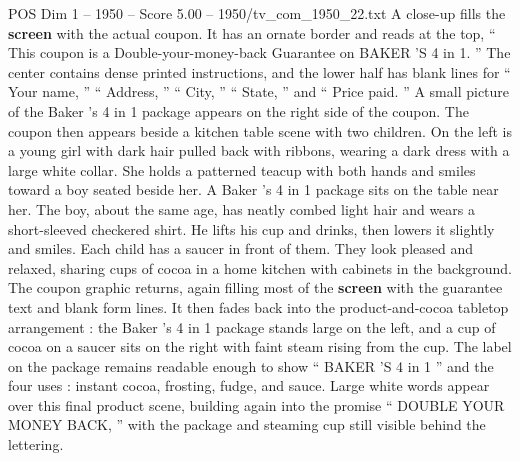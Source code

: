 \begin{textsample}{POS Dim 1 – 1950 – Score 5.00 – 1950/tv\_com\_1950\_22.txt}
A close-up fills the \textbf{screen} with the actual coupon.
It has an ornate border and reads at the top, “ This coupon is a Double-your-money-back Guarantee on BAKER ’S 4 in 1. ” The center contains dense printed instructions, and the lower half has blank lines for “ Your name, ” “ Address, ” “ City, ” “ State, ” and “ Price paid. ” A small picture of the Baker ’s 4 in 1 package appears on the right side of the coupon.
The coupon then appears beside a kitchen table scene with two children.
On the left is a young girl with dark hair pulled back with ribbons, wearing a dark dress with a large white collar.
She holds a patterned teacup with both hands and smiles toward a boy seated beside her.
A Baker ’s 4 in 1 package sits on the table near her.
The boy, about the same age, has neatly combed light hair and wears a short-sleeved checkered shirt.
He lifts his cup and drinks, then lowers it slightly and smiles.
Each child has a saucer in front of them.
They look pleased and relaxed, sharing cups of cocoa in a home kitchen with cabinets in the background.
The coupon graphic returns, again filling most of the \textbf{screen} with the guarantee text and blank form lines.
It then fades back into the product-and-cocoa tabletop arrangement : the Baker ’s 4 in 1 package stands large on the left, and a cup of cocoa on a saucer sits on the right with faint steam rising from the cup.
The label on the package remains readable enough to show “ BAKER ’S 4 in 1 ” and the four uses : instant cocoa, frosting, fudge, and sauce.
Large white words appear over this final product scene, building again into the promise “ DOUBLE YOUR MONEY BACK, ” with the package and steaming cup still visible behind the lettering.

\end{textsample}
